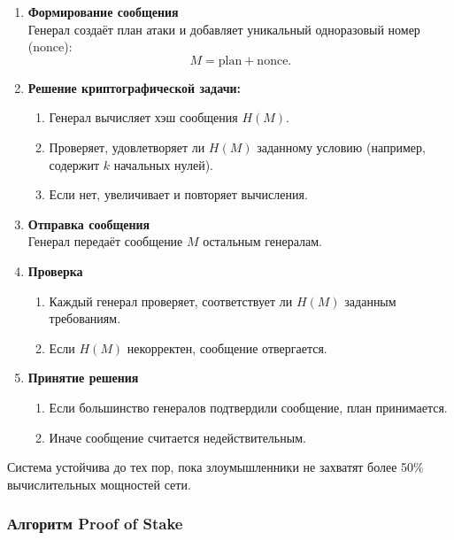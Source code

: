 \begin{enumerate}

    \item \textbf{Формирование сообщения}\\
    Генерал создаёт план атаки и добавляет уникальный одноразовый номер (nonce):
    \[
    M = \text{plan} + \text{nonce}.
    \]

    \item \textbf{Решение криптографической задачи:}
    \begin{enumerate}
        \item Генерал вычисляет хэш сообщения $H(M)$.
        \item Проверяет, удовлетворяет ли $H(M)$ заданному условию (например, содержит $k$ начальных нулей).
        \item Если нет, увеличивает  и повторяет вычисления.
    \end{enumerate}

    \item \textbf{Отправка сообщения}\\
    Генерал передаёт сообщение $M$ остальным генералам.

    \item \textbf{Проверка}
    \begin{enumerate}
        \item Каждый генерал проверяет, соответствует ли $H(M)$ заданным требованиям.
        \item Если $H(M)$ некорректен, сообщение отвергается.
    \end{enumerate}

    \item \textbf{Принятие решения}
    \begin{enumerate}
        \item Если большинство генералов подтвердили сообщение, план принимается.
        \item Иначе сообщение считается недействительным.
    \end{enumerate}
\end{enumerate}

Система устойчива до тех пор, пока злоумышленники не захватят более 50\% вычислительных мощностей сети.~\cite{pogorelov}


\subsubsection{Алгоритм Proof of Stake}

